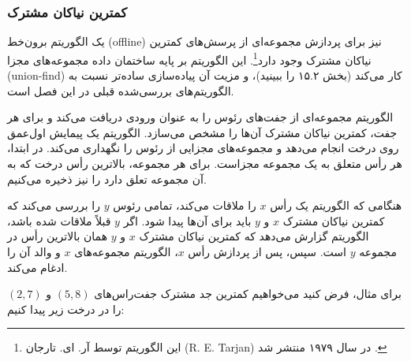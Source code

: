 \subsubsection{کمترین نیاکان مشترک}

یک الگوریتم برون‌خط (offline) نیز
برای پردازش مجموعه‌ای از
پرسش‌های کمترین نیاکان مشترک وجود دارد\footnote{این
الگوریتم توسط آر. ای. تارجان (R. E. Tarjan) در سال ۱۹۷۹ منتشر شد \cite{tar79}.}.
این الگوریتم بر پایه ساختمان داده مجموعه‌های مجزا (union-find) کار می‌کند
(بخش ۱۵.۲ را ببینید)، و مزیت آن
پیاده‌سازی ساده‌تر نسبت به
الگوریتم‌های بررسی‌شده قبلی در این فصل است.

الگوریتم مجموعه‌ای از جفت‌های رئوس را به عنوان ورودی دریافت می‌کند
و برای هر جفت، کمترین نیاکان مشترک آن‌ها را مشخص می‌سازد.
الگوریتم یک پیمایش اول‌عمق روی درخت انجام می‌دهد
و مجموعه‌های مجزایی از رئوس را نگهداری می‌کند.
در ابتدا، هر رأس متعلق به یک مجموعه مجزاست.
برای هر مجموعه، بالاترین رأس درخت
که به آن مجموعه تعلق دارد را نیز ذخیره می‌کنیم.

هنگامی که الگوریتم یک رأس $x$ را ملاقات می‌کند،
تمامی رئوس $y$ را بررسی می‌کند که
کمترین نیاکان مشترک $x$ و $y$
باید برای آن‌ها پیدا شود.
اگر $y$ قبلاً ملاقات شده باشد،
الگوریتم گزارش می‌دهد که 
کمترین نیاکان مشترک $x$ و $y$
همان بالاترین رأس در مجموعه $y$ است.
سپس، پس از پردازش رأس $x$،
الگوریتم مجموعه‌های $x$ و والد آن را ادغام می‌کند.

برای مثال، فرض کنید می‌خواهیم کمترین جد مشترک جفت‌راس‌های $(5,8)$ و $(2,7)$ را در درخت زیر پیدا کنیم:
\begin{center}
\end{center}

